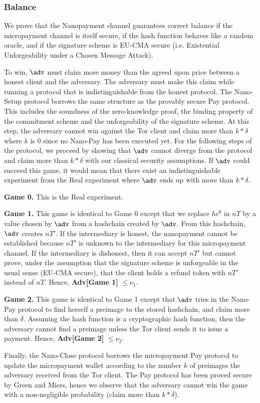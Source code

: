\subsubsection{Balance}

We prove that the Nanopayment channel guarantees correct balance if the
micropayment channel is itself secure, if the hash function behaves like a
random oracle, and if the signature scheme is EU-CMA secure (i.e. Existential
Unforgeability under a Chosen Message Attack).

To win, $\adv$ must claim more money than the agreed upon price between a honest
client and the adversary. The adversary must make this claim while running a
protocol that is indistinguishable from the honest protocol. The Nano-Setup
protocol borrows the same structure as the provably secure Pay protocol. This
includes the soundness of the zero-knowledge proof, the binding property of the
commitment scheme and the unforgeability of the signature scheme. At this step,
the adversary cannot win against the Tor client and claim more than $k*\delta$
where $k$ is 0 since no Nano-Pay has been executed yet. For the following steps
of the protocol, we proceed by showing that $\adv$ cannot diverge from the
protocol and claim more than $k*\delta$ with our classical security assumptions.
If $\adv$ could succeed this game, it would mean that there exist an
indistinguishable experiment from the Real experiment where $\adv$ ends up with
more than $k*\delta$.

\textbf{Game 0.} This is the Real experiment.

\textbf{Game 1.} This game is identical to Game 0 except that we replace $hc^0$
in $nT$ by a value chosen by $\adv$ from a hashchain created by $\adv$. From
this hashchain, $\adv$ creates $nT'$. If the intermediary is honest, the
nanopayment cannot be established because $nT'$ is unknown to the intermediary
for this micropayment channel. If the intermediary is dishonest, then it can
accept $nT'$ but cannot prove, under the assumption that the signature scheme is
unforgeable in the usual sense (EU-CMA secure), that the client holds a refund
token with $nT'$ instead of $nT$. Hence, \textbf{Adv[Game 1]} $\leq \nu_1$.

\textbf{Game 2.} This game is identical to Game 1 except that $\adv$ tries in
the Nano-Pay protocol to find herself a preimage to the stored hashchain, and
claim more than $\delta$. Assuming the hash function is a cryptographic hash
function, then the adversary cannot find a preimage unless the Tor client sends
it to issue a payment. Hence, \textbf{Adv[Game 2]} $\leq \nu_2$.

Finally, the Nano-Close protocol borrows the micropayment Pay protocol to update
the micropayment wallet according to the number $k$ of preimages the adversary
received from the Tor client. The Pay protocol has been proved secure by Green
and Miers, hence we observe that the adversary cannot win the game with a
non-negligible probability (claim more than $k*\delta$).


